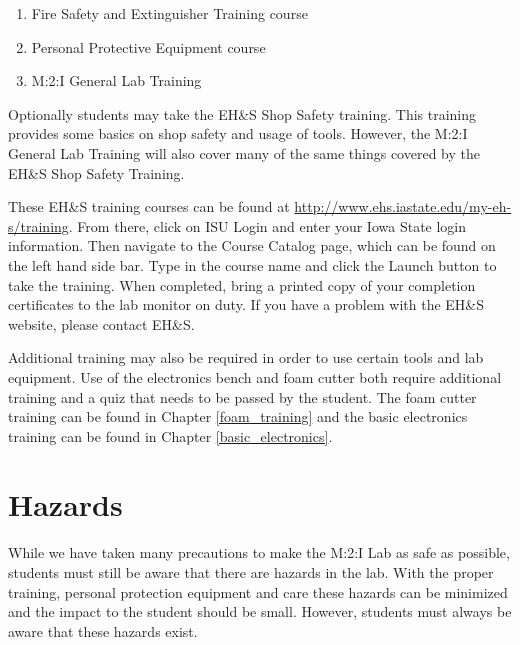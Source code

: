 \begin{enumerate}
\item Fire Safety and Extinguisher Training course
\item Personal Protective Equipment course
\item M:2:I General Lab Training
\end{enumerate}

Optionally students may take the EH\&S Shop Safety training.  This training provides some basics on shop safety and usage of tools.  However, the M:2:I General Lab Training will also cover many of the same things covered by the EH\&S Shop Safety Training.

These EH\&S training courses can be found at \url{http://www.ehs.iastate.edu/my-eh-s/training}. From there, click on ISU Login and enter your Iowa State login information. Then navigate to the Course Catalog page, which can be found on the left hand side bar. Type in the course name and click the Launch button to take the training. When completed, bring a printed copy of your completion certificates to the lab monitor on duty.  If you have a problem with the EH\&S website, please contact EH\&S.

Additional training may also be required in order to use certain tools and lab equipment.  Use of the electronics bench and foam cutter both require additional training and a quiz that needs to be passed by the student.  The foam cutter training can be found in Chapter \ref{foam_training} and the basic electronics training can be found in Chapter \ref{basic_electronics}.

\section{Hazards}
While we have taken many precautions to make the M:2:I Lab as safe as possible, students must still be aware that there are hazards in the lab.  With the proper training, personal protection equipment and care these hazards can be minimized and the impact to the student should be small.  However, students must always be aware that these hazards exist.  

